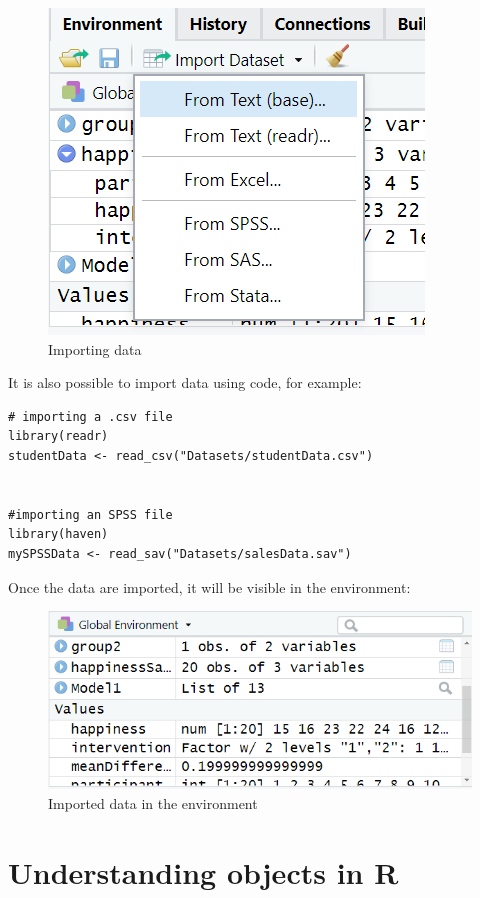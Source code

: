 \documentclass[
]{book}
\begin{document}
\begin{figure}
\centering
\includegraphics{images/importData.png}
\caption{Importing data}
\end{figure}

It is also possible to import data using code, for example:

\begin{verbatim}
# importing a .csv file
library(readr)
studentData <- read_csv("Datasets/studentData.csv")


#importing an SPSS file
library(haven)
mySPSSData <- read_sav("Datasets/salesData.sav")
\end{verbatim}

Once the data are imported, it will be visible in the environment:

\begin{figure}
\centering
\includegraphics{images/environment.png}
\caption{Imported data in the environment}
\end{figure}

\hypertarget{understanding-objects-in-r}{%
\section{Understanding objects in R}\label{understanding-objects-in-r}}
\end{document}
